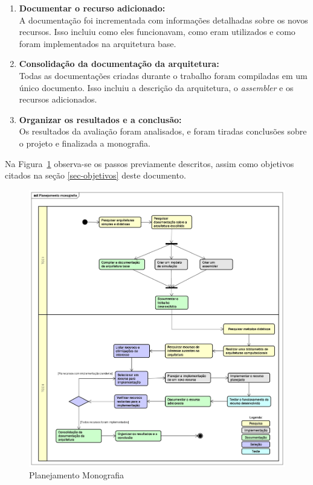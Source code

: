 \documentclass[
	12pt,				%
	openright,			%
	oneside,			%
	a4paper,			%
	english,			%
	french,				%
	spanish,			%
	brazil,				%
	]{abntex2}
\begin{document}
\begin{enumerate}[label=\textbf{\arabic*.}]
    \item \textbf{Documentar o recurso adicionado:} \\
    A documentação foi incrementada com informações detalhadas sobre os novos recursos. Isso incluiu como eles funcionavam, como eram utilizados e como foram implementados na arquitetura base.
    
    \item \textbf{Consolidação da documentação da arquitetura:} \\
    Todas as documentações criadas durante o trabalho foram compiladas em um único documento. Isso incluiu a descrição da arquitetura, o \textit{assembler} e os recursos adicionados.
    
    \item \textbf{Organizar os resultados e a conclusão:} \\
    Os resultados da avaliação foram analisados, e foram tiradas conclusões sobre o projeto e finalizada a monografia.
\end{enumerate}
\clearpage
Na Figura~\ref{fig:Planejamento_Monografia} observa-se os passos previamente descritos, assim como objetivos citados na seção \ref{sec-objetivos} deste documento.
\begin{figure}
    \includegraphics[width=1\linewidth]{Planejamento monografia.png}
    \caption{Planejamento Monografia}
    \label{fig:Planejamento_Monografia}
\end{figure}
\end{document}
